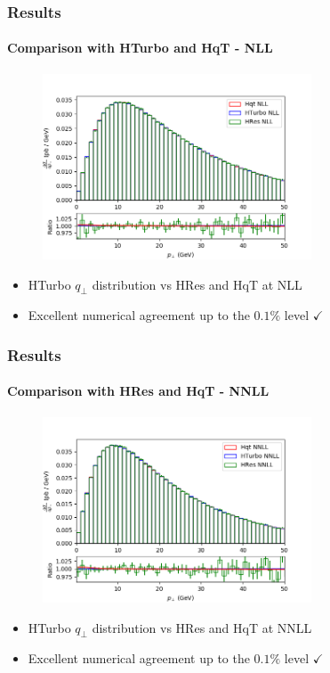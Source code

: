 \documentclass[aspectratio=43]{beamer}
\begin{document}
\begin{frame}

	\frametitle{Results}
	\framesubtitle{Comparison with HTurbo and HqT - NLL}
	
	\begin{figure}
		\includegraphics[width = 8cm]{plots/hturbo_NLL.png}
	\end{figure}
	
	\begin{itemize}
		\item \footnotesize HTurbo $q_{\perp}$ distribution vs HRes and HqT at NLL
		\item \footnotesize Excellent numerical agreement up to the $0.1\%$ level {\color{darkgreen}$\checkmark$} 
	\end{itemize}

\end{frame}

\begin{frame}

	\frametitle{Results}
	\framesubtitle{Comparison with HRes and HqT - NNLL}
	
	\begin{figure}
		\includegraphics[width = 8cm]{plots/hturbo_NNLL.png}
	\end{figure}
	
	\begin{itemize}
		\item \footnotesize HTurbo $q_{\perp}$ distribution vs HRes and HqT at NNLL
		\item \footnotesize Excellent numerical agreement up to the $0.1\%$ level {\color{darkgreen}$\checkmark$} 
\end{itemize}

\end{frame}
\end{document}
